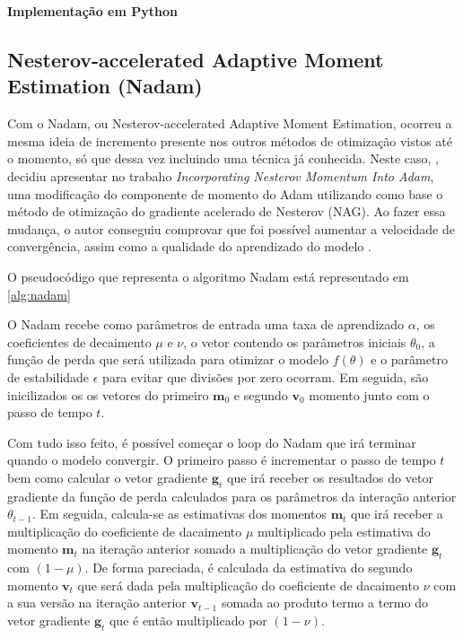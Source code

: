 \textbf{Implementação em Python}

\subsection{Nesterov-accelerated Adaptive Moment Estimation (Nadam)}

Com o Nadam, ou Nesterov-accelerated Adaptive Moment Estimation, ocorreu a mesma ideia de incremento presente nos outros métodos de otimização vistos até o momento, só que dessa vez incluindo uma técnica já conhecida. Neste caso, \textcite{NadamMethod}, decidiu apresentar no trabaho \textit{Incorporating Nesterov Momentum Into Adam}, uma modificação do componente de momento do Adam utilizando como base o método de otimização do gradiente acelerado de Nesterov (NAG). Ao fazer essa mudança, o autor conseguiu comprovar que foi possível aumentar a velocidade de convergência, assim como a qualidade do aprendizado do modelo \parencite{NadamMethod}.

O pseudocódigo que representa o algoritmo Nadam está representado em \ref{alg:nadam}

O Nadam recebe como parâmetros de entrada uma taxa de aprendizado $\alpha$, os coeficientes de decaimento $\mu$ e $\nu$, o vetor contendo os parâmetros iniciais $\theta_0$, a função de perda que será utilizada para otimizar o modelo $f(\theta)$ e o parâmetro de estabilidade $\epsilon$ para evitar que divisões por zero ocorram. Em seguida, são inicilizados os os vetores do primeiro $\mathbf{m}_0$ e segundo $\mathbf{v}_0$ momento junto com o passo de tempo $t$.

Com tudo isso feito, é possível começar o loop do Nadam que irá terminar quando o modelo convergir. O primeiro passo é incrementar o passo de tempo $t$ bem como calcular o vetor gradiente $\mathbf{g}_t$ que irá receber os resultados do vetor gradiente da função de perda calculados para os parâmetros da interação anterior $\theta_{t-1}$. Em seguida, calcula-se as estimativas dos momentos $\mathbf{m}_t$ que irá receber a multiplicação do coeficiente de dacaimento $\mu$ multiplicado pela estimativa do momento $\mathbf{m}_t$ na iteração anterior somado a multiplicação do vetor gradiente $\mathbf{g}_t$ com $(1 - \mu)$. De forma pareciada, é calculada da estimativa do segundo momento $\mathbf{v}_t$ que será dada pela multiplicação do coeficiente de dacaimento $\nu$ com a sua versão na iteração anterior $\mathbf{v}_{t-1}$ somada ao produto termo a termo do vetor gradiente $\mathbf{g}_t$ que é então multiplicado por $(1 - \nu)$.


